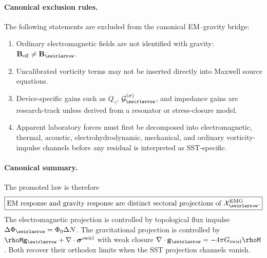         \paragraph{Canonical exclusion rules.}
        The following statements are excluded from the canonical EM--gravity bridge:
        \begin{enumerate}
            \item Ordinary electromagnetic fields are not identified with gravity: \(\mathbf{B}_{\mathrm{eff}}\neq\mathbf{B}_{\swirlarrow}\).
            \item Uncalibrated vorticity terms may not be inserted directly into Maxwell source equations.
            \item Device-specific gains such as \(Q_\gamma\), \(\mathcal{G}^{(\sigma)}_{\swirlarrow}\), and impedance gains are research-track unless derived from a resonator or stress-closure model.
            \item Apparent laboratory forces must first be decomposed into electromagnetic, thermal, acoustic, electrohydrodynamic, mechanical, and ordinary vorticity-impulse channels before any residual is interpreted as SST-specific.
        \end{enumerate}

        \paragraph{Canonical summary.}
        The promoted law is therefore
        \begin{align}
            \boxed{
            \text{EM response and gravity response are distinct sectoral projections of }\mathcal{X}^{\mathrm{EMG}}_{\swirlarrow}.
            }
            \label{eq:canonical_emg_summary_law}
        \end{align}
        The electromagnetic projection is controlled by topological flux impulse \(\Delta\Phi_{\swirlarrow}=\Phi_0\Delta N\). The gravitational projection is controlled by \(\rhoM\mathbf{g}_{\swirlarrow}+\nabla\cdot\boldsymbol{\sigma}^{\mathrm{swirl}}\) with weak closure \(\nabla\cdot\mathbf{g}_{\swirlarrow}=-4\pi G_{\mathrm{swirl}}\rhoM\). Both recover their orthodox limits when the SST projection channels vanish.

